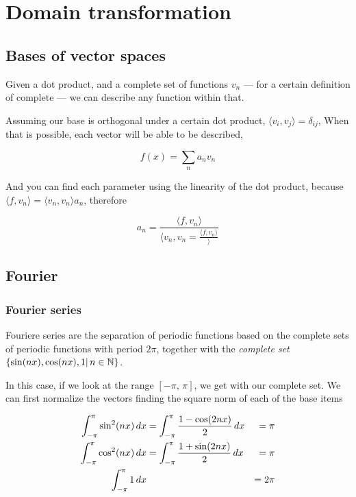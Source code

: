 \documentclass[../main/main.tex]{subfiles}
\begin{document}
\section{Domain transformation}

\subsection{Bases of vector spaces}

Given a dot product, and a complete set of functions ${v_{n}}$ --- for a certain definition of complete --- we can describe any function within that.

Assuming our base is orthogonal under a certain dot product, $\langle v_{i},v_{j}\!\rangle = \delta_{ij}$, When that is possible, each vector will be able to be described,

\begin{equation}
	f(x) = \sum_{n}a_{n} v_{n}
\end{equation}

And you can find each parameter using the linearity of the dot product,  because $\langle f,\! v_{n}\rangle = \langle v_{n},\! v_{n}\rangle a_{n}$, therefore

\begin{equation}
	a_{n} = \frac{\langle f,\! v_{n}\rangle}{\langle v_{n},\! v_{n} = \frac{\langle f,\! v_{n}\rangle}\rangle}
\end{equation}




\subsection{Fourier}


\subsubsection{Fourier series}

Fouriere series are the separation of periodic functions based on the complete sets  of periodic functions with period $2\pi$, together with the \emph{complete set} $\left\{\sin (nx), \cos(nx), 1 | \,n \in \mathbb{N}\right\}$.

In this case, if we look at the range  $[-\pi,\, \pi]$, we get with our complete set. We can first normalize the vectors finding the square norm of each of the base items

\begin{align}
	\fourierint{\sin^{2}(nx)} & =\fourierint{\frac{1-\cos(2nx)}{2}} & =\pi  \\
	\fourierint{\cos^{2}(nx)} & =\fourierint{\frac{1+\sin(2nx)}{2}} & =\pi  \\
	\fourierint{1}            &                                     & =2\pi
\end{align}
\end{document}
